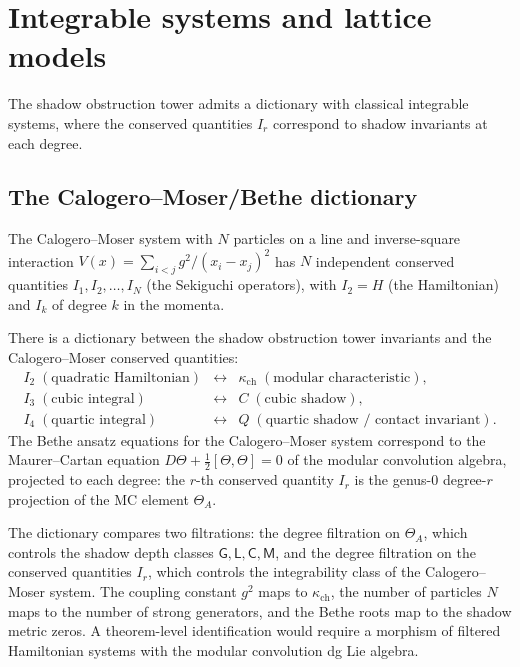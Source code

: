 \section{Integrable systems and lattice models}
\label{sec:integrable-systems}

The shadow obstruction tower admits a dictionary with classical integrable systems, where the conserved quantities $I_r$ correspond to shadow invariants at each degree.



\subsection{The Calogero--Moser/Bethe dictionary}
\label{subsec:calogero-moser-bethe}

The Calogero--Moser system with $N$ particles on a line and inverse-square interaction $V(x) = \sum_{i < j} g^2 / (x_i - x_j)^2$ has $N$ independent conserved quantities $I_1, I_2, \ldots, I_N$ (the Sekiguchi operators), with $I_2 = H$ (the Hamiltonian) and $I_k$ of degree $k$ in the momenta.

\begin{conjecture}
\label{conj:shadow-integrable-dictionary}
\ClaimStatusConjectured
There is a dictionary between the shadow obstruction tower invariants and the Calogero--Moser conserved quantities:
\[
 \begin{array}{rcl}
 I_2 \;(\text{quadratic Hamiltonian}) &\longleftrightarrow& \kappa_{\mathrm{ch}} \;(\text{modular characteristic}), \\[4pt]
 I_3 \;(\text{cubic integral}) &\longleftrightarrow& C \;(\text{cubic shadow}), \\[4pt]
 I_4 \;(\text{quartic integral}) &\longleftrightarrow& Q \;(\text{quartic shadow / contact invariant}).
 \end{array}
\]
The Bethe ansatz equations for the Calogero--Moser system correspond to the Maurer--Cartan equation $D \Theta + \tfrac{1}{2}[\Theta, \Theta] = 0$ of the modular convolution algebra, projected to each degree: the $r$-th conserved quantity $I_r$ is the genus-$0$ degree-$r$ projection of the MC element $\Theta_A$.
\end{conjecture}

\begin{remark}
The dictionary compares two filtrations: the degree filtration on
\(\Theta_A\), which controls the shadow depth classes
\(\mathsf G,\mathsf L,\mathsf C,\mathsf M\), and the degree filtration on
the conserved quantities \(I_r\), which controls the integrability class
of the Calogero--Moser system. The coupling constant \(g^2\) maps to
\(\kappa_{\mathrm{ch}}\), the number of particles \(N\) maps to the
number of strong generators, and the Bethe roots map to the shadow
metric zeros. A theorem-level identification would require a morphism of
filtered Hamiltonian systems with the modular convolution dg Lie algebra.
\end{remark}

